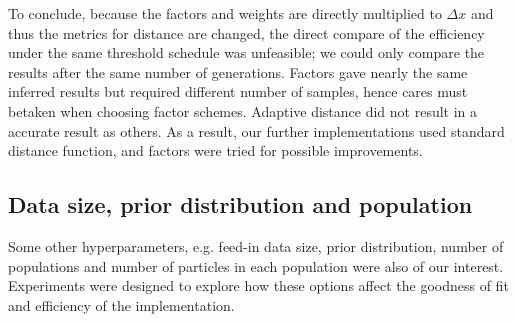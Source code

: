 To conclude, because the factors and weights are directly multiplied to $\Delta x$ and thus the metrics for distance are changed, the direct compare of the efficiency under the same threshold schedule was unfeasible; we could only compare the results after the same number of generations. Factors gave nearly the same inferred results but required different number of samples, hence cares must betaken when choosing factor schemes. Adaptive distance did not result in a accurate result as others. As a result, our further implementations used standard distance function, and factors were tried for possible improvements.







\subsection{Data size, prior distribution and population}


Some other hyperparameters, e.g. feed-in data size, prior distribution, number of populations and number of particles in each population were also of our interest. Experiments were designed to explore how these options affect the goodness of fit and efficiency of the implementation.

